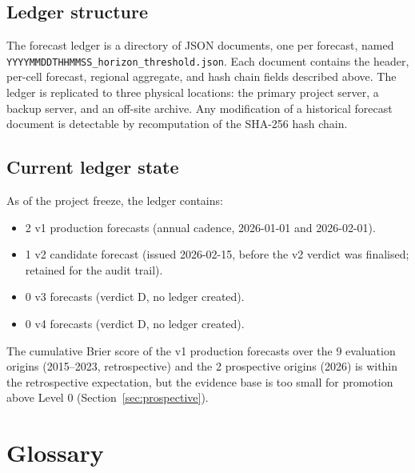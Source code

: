 \documentclass[10pt,a4paper,twocolumn]{article}
\begin{document}
\subsection{Ledger structure}

The forecast ledger is a directory of JSON documents, one per forecast, named \texttt{YYYYMMDDTHHMMSS\_horizon\_threshold.json}. Each document contains the header, per-cell forecast, regional aggregate, and hash chain fields described above. The ledger is replicated to three physical locations: the primary project server, a backup server, and an off-site archive. Any modification of a historical forecast document is detectable by recomputation of the SHA-256 hash chain.

\subsection{Current ledger state}

As of the project freeze, the ledger contains:

\begin{itemize}[leftmargin=1.2em,itemsep=2pt,topsep=2pt]
\item 2 v1 production forecasts (annual cadence, 2026-01-01 and 2026-02-01).
\item 1 v2 candidate forecast (issued 2026-02-15, before the v2 verdict was finalised; retained for the audit trail).
\item 0 v3 forecasts (verdict D, no ledger created).
\item 0 v4 forecasts (verdict D, no ledger created).
\end{itemize}

The cumulative Brier score of the v1 production forecasts over the 9 evaluation origins (2015--2023, retrospective) and the 2 prospective origins (2026) is within the retrospective expectation, but the evidence base is too small for promotion above Level 0 (Section~\ref{sec:prospective}).

\section{Glossary}\label{app:glossary}
\end{document}
